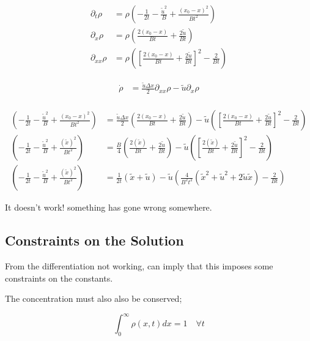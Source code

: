 \documentclass[a4paper]{article}
\begin{document}
\begin{align*}
\partial _t \rho & = \rho \left( - \frac{1}{2t} - \frac{\tilde{u} ^2}{B} + \frac{(x_0 - x)^2}{Bt^2} \right) \\
\partial _x \rho & = \rho \left( \frac{2(x_0 -x )}{Bt} + \frac{2 \tilde{u}}{Bt} \right) \\
\partial_{xx} \rho & = \rho \left( \left[ \frac{2(x_0 -x )}{Bt} + \frac{2 \tilde{u}}{Bt} \right] ^2 - \frac{2}{Bt} \right)
\end{align*}

\begin{align*}
\dot{\rho} & = \frac{\tilde{u} \Delta x}{2} \partial _{xx} \rho - \tilde{u} \partial _x \rho \\
\end{align*}

\begin{align*}
\left( - \frac{1}{2t} - \frac{\tilde{u} ^2}{B} + \frac{(x_0 - x)^2}{Bt^2} \right) & = \frac{\tilde{u} \Delta x}{2} \left( \frac{2(x_0 -x )}{Bt} + \frac{2 \tilde{u}}{Bt} \right) - \tilde{u} \left( \left[ \frac{2(x_0 -x )}{Bt} + \frac{2 \tilde{u}}{Bt} \right] ^2 - \frac{2}{Bt} \right) \\
\left( - \frac{1}{2t} - \frac{\tilde{u} ^2}{B} + \frac{(\tilde{x})^2}{Bt^2} \right) & = \frac{B}{4} \left( \frac{2(\tilde{x})}{Bt} + \frac{2 \tilde{u}}{Bt} \right) - \tilde{u} \left( \left[ \frac{2(\tilde{x} )}{Bt} + \frac{2 \tilde{u}}{Bt} \right] ^2 - \frac{2}{Bt} \right) \\
\left( - \frac{1}{2t} - \frac{\tilde{u} ^2}{B} + \frac{(\tilde{x})^2}{Bt^2} \right) & = \frac{1}{2t} (\tilde{x} + \tilde{u} ) - \tilde{u} \left( \frac{4}{B^2 t^2}( \tilde{x} ^2 + \tilde{u}^2 + 2 \tilde{u} \tilde{x} ) - \frac{2}{Bt} \right)
\end{align*}

It doesn't work! something has gone wrong somewhere. 

\subsection*{Constraints on the Solution}

From the differentiation not working, can imply that this imposes some constraints on the constants. 

The concentration must also also be conserved; 

\begin{equation}
\int _0 ^\infty \rho (x,t ) dx = 1 \quad \forall t
\end{equation}
\end{document}
